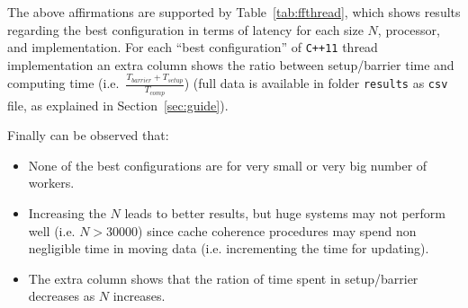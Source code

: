 The above affirmations are supported by Table~\ref{tab:ffthread}, which shows results regarding the best configuration in terms of latency for each size $N$, processor, and implementation.
For each ``best configuration'' of \verb|C++11| thread implementation an extra column shows the ratio between setup/barrier time and computing time (i.e.\ $\frac{T_{barrier} + T_{setup}}{T_{comp}}$) (full data is available in folder \verb|results| as \verb|csv| file, as explained in Section~\ref{sec:guide}).

Finally can be observed that:
\begin{itemize}
	\item None of the best configurations are for very small or very big number of workers.
	\item Increasing the $N$ leads to better results, but huge systems may not perform well (i.e. $N > 30000$) since cache coherence procedures may spend non negligible time in moving data (i.e. incrementing the time for updating).
	\item The extra column shows that the ration of time spent in setup/barrier decreases as $N$ increases.
\end{itemize}

